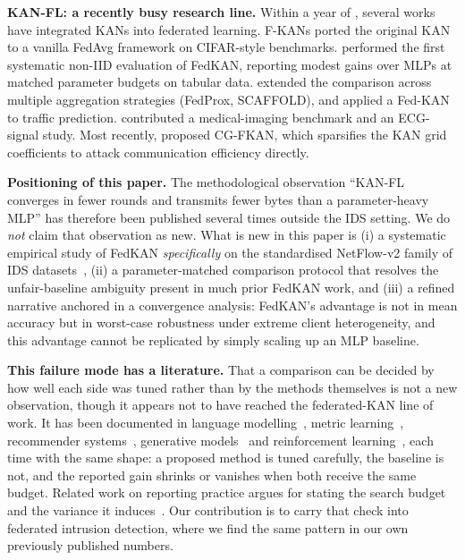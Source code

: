 \textbf{KAN-FL: a recently busy research line.} Within a year of \cite{liu2024kan}, several works have integrated KANs into federated learning. F-KANs \cite{zeydan2024fkans} ported the original KAN to a vanilla FedAvg framework on CIFAR-style benchmarks. \cite{sasse2024evaluating} performed the first systematic non-IID evaluation of FedKAN, reporting modest gains over MLPs at matched parameter budgets on tabular data. \cite{ma2025enhancing} extended the comparison across multiple aggregation strategies (FedProx, SCAFFOLD), and \cite{zeydan2025fedkan} applied a Fed-KAN to traffic prediction. \cite{lee2025unified} contributed a medical-imaging benchmark and \cite{zeleke2024federated} an ECG-signal study. Most recently, \cite{yu2025cgfkan} proposed CG-FKAN, which sparsifies the KAN grid coefficients to attack communication efficiency directly.

\textbf{Positioning of this paper.} The methodological observation ``KAN-FL converges in fewer rounds and transmits fewer bytes than a parameter-heavy MLP'' has therefore been published several times outside the IDS setting. We do \emph{not} claim that observation as new. What is new in this paper is (i) a systematic empirical study of FedKAN \emph{specifically} on the standardised NetFlow-v2 family of IDS datasets~\cite{sarhan2022standard}, (ii) a parameter-matched comparison protocol that resolves the unfair-baseline ambiguity present in much prior FedKAN work, and (iii) a refined narrative anchored in a convergence analysis: FedKAN's advantage is not in mean accuracy but in worst-case robustness under extreme client heterogeneity, and this advantage cannot be replicated by simply scaling up an MLP baseline.

\textbf{This failure mode has a literature.} That a comparison can be decided by how well each
side was tuned rather than by the methods themselves is not a new observation, though it appears
not to have reached the federated-KAN line of work. It has been documented in language
modelling~\cite{melis2018eval}, metric learning~\cite{musgrave2020reality}, recommender
systems~\cite{dacrema2019progress}, generative models~\cite{lucic2018gans} and reinforcement
learning~\cite{henderson2018matters}, each time with the same shape: a proposed method is tuned
carefully, the baseline is not, and the reported gain shrinks or vanishes when both receive the
same budget. Related work on reporting practice argues for stating the search budget and the
variance it induces~\cite{dodge2019showwork,bouthillier2021variance}. Our contribution is to
carry that check into federated intrusion detection, where we find the same pattern in our own
previously published numbers.

